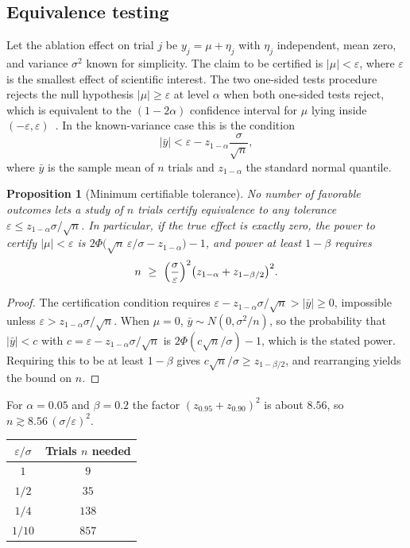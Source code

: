 \documentclass[11pt]{article}
\newtheorem{proposition}[theorem]{Proposition}
\theoremstyle{definition}
\theoremstyle{remark}
\begin{document}
\subsection{Equivalence testing}

Let the ablation effect on trial $j$ be $y_j=\mu+\eta_j$ with $\eta_j$ independent, mean zero, and variance $\sigma^2$ known for simplicity. The claim to be certified is $|\mu|<\varepsilon$, where $\varepsilon$ is the smallest effect of scientific interest. The two one-sided tests procedure rejects the null hypothesis $|\mu|\ge\varepsilon$ at level $\alpha$ when both one-sided tests reject, which is equivalent to the $(1-2\alpha)$ confidence interval for $\mu$ lying inside $(-\varepsilon,\varepsilon)$~\cite{lakens2017}. In the known-variance case this is the condition
\[
|\bar y|<\varepsilon-z_{1-\alpha}\frac{\sigma}{\sqrt n},
\]
where $\bar y$ is the sample mean of $n$ trials and $z_{1-\alpha}$ the standard normal quantile.

\begin{proposition}[Minimum certifiable tolerance]\label{prop:mincert}
No number of favorable outcomes lets a study of $n$ trials certify equivalence to any tolerance $\varepsilon\le z_{1-\alpha}\sigma/\sqrt n$. In particular, if the true effect is exactly zero, the power to certify $|\mu|<\varepsilon$ is $2\Phi\bigl(\sqrt n\,\varepsilon/\sigma-z_{1-\alpha}\bigr)-1$, and power at least $1-\beta$ requires
\[
n\ \ge\ \Bigl(\frac{\sigma}{\varepsilon}\Bigr)^{2}\bigl(z_{1-\alpha}+z_{1-\beta/2}\bigr)^{2}.
\]
\end{proposition}
\begin{proof}
The certification condition requires $\varepsilon-z_{1-\alpha}\sigma/\sqrt n>|\bar y|\ge0$, impossible unless $\varepsilon>z_{1-\alpha}\sigma/\sqrt n$. When $\mu=0$, $\bar y\sim N(0,\sigma^2/n)$, so the probability that $|\bar y|<c$ with $c=\varepsilon-z_{1-\alpha}\sigma/\sqrt n$ is $2\Phi(c\sqrt n/\sigma)-1$, which is the stated power. Requiring this to be at least $1-\beta$ gives $c\sqrt n/\sigma\ge z_{1-\beta/2}$, and rearranging yields the bound on $n$.
\end{proof}

For $\alpha=0.05$ and $\beta=0.2$ the factor $(z_{0.95}+z_{0.90})^2$ is about $8.56$, so $n\gtrsim 8.56\,(\sigma/\varepsilon)^2$.

\begin{center}
\small
\begin{tabular}{cc}
\toprule
$\varepsilon/\sigma$ & Trials $n$ needed\\
\midrule
$1$ & $9$\\
$1/2$ & $35$\\
$1/4$ & $138$\\
$1/10$ & $857$\\
\bottomrule
\end{tabular}
\end{center}
\end{document}
